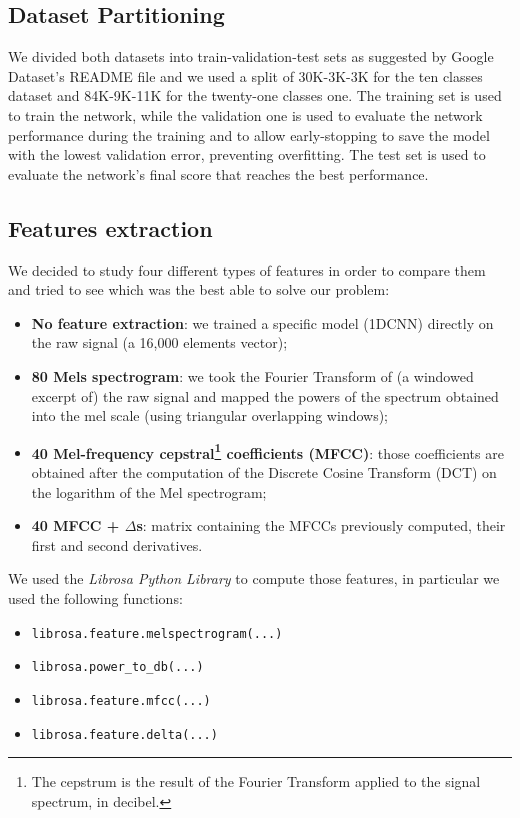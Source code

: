 \documentclass[conference]{IEEEtran}
\begin{document}
\subsection{Dataset Partitioning}
We divided both datasets into train-validation-test sets as suggested by Google Dataset’s README file and we used a split of 30K-3K-3K for the ten classes dataset and 84K-9K-11K for the twenty-one classes one. The training set is used to train the network, while the validation one is used to evaluate the network performance during the training and to allow early-stopping to save the model with the lowest validation error, preventing overfitting. The test set is used to evaluate the network’s final score that reaches the best performance.

\subsection{Features extraction}

We decided to study four different types of features in order to compare them and tried to see which was the best able to solve our problem:
\begin{itemize}
\item \textbf{No feature extraction}: we trained a specific model (1DCNN) directly on the raw signal (a 16,000 elements vector);
\item \textbf{80 Mels spectrogram}: we took the Fourier Transform of (a windowed excerpt of) the raw signal and mapped the powers of the spectrum obtained into the mel scale (using triangular overlapping windows);
\item \textbf{40 Mel-frequency cepstral\footnote{The cepstrum is the result of the Fourier Transform applied to the signal spectrum, in decibel.} coefficients (MFCC)}: those coefficients are obtained after the computation of the Discrete Cosine Transform (DCT) on the logarithm of the Mel spectrogram;
\item \textbf{40 MFCC + $\Delta$s}: matrix containing the MFCCs previously computed, their first and second derivatives.
\end{itemize}
We used the \textit{Librosa Python Library} to compute those features, in particular we used the following functions:
\begin{itemize}
\item \texttt{librosa.feature.melspectrogram(...)}
\item \texttt{librosa.power\_to\_db(...)}
\item \texttt{librosa.feature.mfcc(...)}
\item \texttt{librosa.feature.delta(...)}
\end{itemize}
\end{document}
